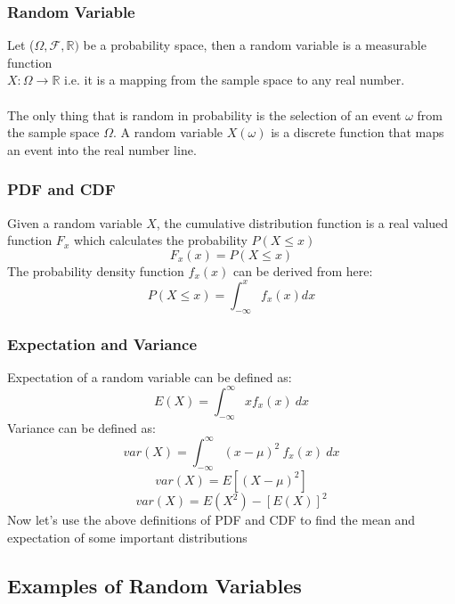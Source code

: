 \documentclass[12pt]{article}
\begin{document}
\subsubsection{Random Variable}
Let ($\Omega, \mathcal{F}, \mathbb{R})$ be a probability space, then a random variable is a measurable function \\ $X : \Omega \xrightarrow{} \mathbb{R}$ i.e. it is a mapping from the sample space to any real number. \\ \\ The only thing that is random in probability is the selection of an event $\omega$ from the sample space $\Omega$. A random variable $X(\omega)$ is a discrete function that maps an event into the real number line. 
\subsubsection{PDF and CDF}
Given a random variable $X$, the cumulative distribution function is a real valued function $F_x$ which calculates the probability $P(X \leq x)$
\begin{equation*}
    F_x(x) = P(X \leq x)
\end{equation*}
The probability density function $f_x(x)$ can be derived from here:
\begin{equation*}
    P(X \leq x) = \int_{-\infty}^{x} f_x(x) dx
\end{equation*}
\subsubsection{Expectation and Variance}
Expectation of a random variable can be defined as:
\begin{equation*}
    E(X) = \int_{-\infty}^{\infty} x f_x(x) \:dx
\end{equation*}
Variance can be defined as:
\begin{equation*}
    var(X) = \int_{-\infty}^{\infty} (x - \mu)^{2} \: f_x(x)\: dx
\end{equation*}
\begin{equation*}
    var(X) = E[(X - \mu)^{2}]
\end{equation*}
\begin{equation*}
    var(X) = E(X^2) - [E(X)]^{2}
\end{equation*}
Now let's use the above definitions of PDF and CDF to find the mean and expectation of some important distributions 

\subsection{Examples of Random Variables}
\end{document}
